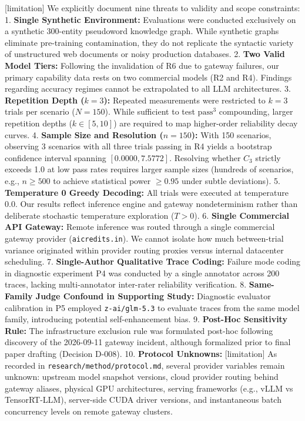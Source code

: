 \documentclass[11pt,letterpaper]{article}
\begin{document}
[limitation] We explicitly document nine threats to validity and scope constraints:
1. \textbf{Single Synthetic Environment:} Evaluations were conducted exclusively on a synthetic 300-entity pseudoword knowledge graph. While synthetic graphs eliminate pre-training contamination, they do not replicate the syntactic variety of unstructured web documents or noisy production databases.
2. \textbf{Two Valid Model Tiers:} Following the invalidation of R6 due to gateway failures, our primary capability data rests on two commercial models (R2 and R4). Findings regarding accuracy regimes cannot be extrapolated to all LLM architectures.
3. \textbf{Repetition Depth ($k=3$):} Repeated measurements were restricted to $k=3$ trials per scenario ($N=150$). While sufficient to test $\text{pass}^3$ compounding, larger repetition depths ($k \in [5, 10]$) are required to map higher-order reliability decay curves.
4. \textbf{Sample Size and Resolution ($n=150$):} With 150 scenarios, observing 3 scenarios with all three trials passing in R4 yields a bootstrap confidence interval spanning $[0.0000, 7.5772]$. Resolving whether $C_3$ strictly exceeds 1.0 at low pass rates requires larger sample sizes (hundreds of scenarios, e.g., $n \ge 500$ to achieve statistical power $\ge 0.95$ under subtle deviations).
5. \textbf{Temperature 0 Greedy Decoding:} All trials were executed at temperature 0.0. Our results reflect inference engine and gateway nondeterminism rather than deliberate stochastic temperature exploration ($T > 0$).
6. \textbf{Single Commercial API Gateway:} Remote inference was routed through a single commercial gateway provider (\texttt{aicredits.in}). We cannot isolate how much between-trial variance originated within provider routing proxies versus internal datacenter scheduling.
7. \textbf{Single-Author Qualitative Trace Coding:} Failure mode coding in diagnostic experiment P4 was conducted by a single annotator across 200 traces, lacking multi-annotator inter-rater reliability verification.
8. \textbf{Same-Family Judge Confound in Supporting Study:} Diagnostic evaluator calibration in P5 employed \texttt{z-ai/glm-5.3} to evaluate traces from the same model family, introducing potential self-enhancement bias.
9. \textbf{Post-Hoc Sensitivity Rule:} The infrastructure exclusion rule was formulated post-hoc following discovery of the 2026-09-11 gateway incident, although formalized prior to final paper drafting (Decision D-008).
10. \textbf{Protocol Unknowns:} [limitation] As recorded in \texttt{research/method/protocol.md}, several provider variables remain unknown: upstream model snapshot versions, cloud provider routing behind gateway aliases, physical GPU architectures, serving frameworks (e.g., vLLM vs TensorRT-LLM), server-side CUDA driver versions, and instantaneous batch concurrency levels on remote gateway clusters.
\end{document}
